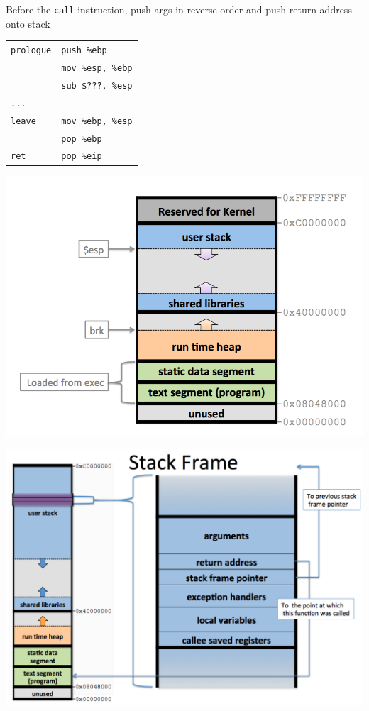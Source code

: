 \documentclass[10pt,landscape]{article}
\begin{document}
\begin{multicols}{3}
Before the \texttt{call} instruction, push args in reverse order and push return address onto stack

\begin{tabular}{@{}ll@{}}
\texttt{prologue}   & \texttt{push \%ebp} \\
                    & \texttt{mov \%esp, \%ebp} \\
                    & \texttt{sub \$???, \%esp} \\
\texttt{...} \\
\texttt{leave}      & \texttt{mov \%ebp, \%esp} \\
                    & \texttt{pop \%ebp} \\
\texttt{ret}        & \texttt{pop \%eip} \\
\end{tabular}


\includegraphics[scale=0.26]{memory.png}

\includegraphics[scale=0.22]{stack_frame.png}



\end{multicols}
\end{document}
